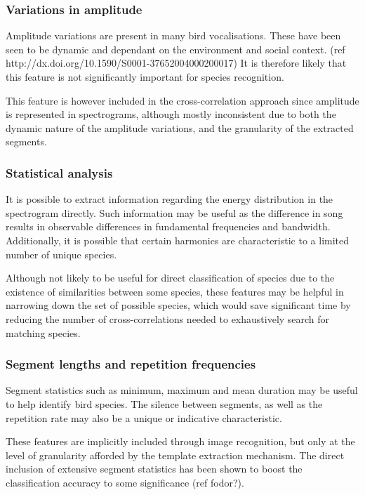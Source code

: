 \subsubsection{Variations in amplitude}
Amplitude variations are present in many bird vocalisations.
These have been seen to be dynamic and dependant on the environment and social
context. (ref http://dx.doi.org/10.1590/S0001-37652004000200017)
It is therefore likely that this feature is not significantly important for
species recognition.

This feature is however included in the cross-correlation approach since
amplitude is represented in spectrograms, although mostly inconsistent due to
both the dynamic nature of the amplitude variations, and the granularity of the
extracted segments.

\subsubsection{Statistical analysis}
It is possible to extract information regarding the energy distribution in the
spectrogram directly.
Such information may be useful as the difference in song results in observable
differences in fundamental frequencies and bandwidth.
Additionally, it is possible that certain harmonics are characteristic to a
limited number of unique species.

Although not likely to be useful for direct classification of species due to the
existence of similarities between some species, these features may be helpful in
narrowing down the set of possible species, which would save significant time by
reducing the number of cross-correlations needed to exhaustively search for
matching species.

\subsubsection{Segment lengths and repetition frequencies}
Segment statistics such as minimum, maximum and mean duration may be useful to
help identify bird species.
The silence between segments, as well as the repetition rate may also be a
unique or indicative characteristic.

These features are implicitly included through image recognition, but only at
the level of granularity afforded by the template extraction mechanism.
The direct inclusion of extensive segment statistics has been shown to boost
the classification accuracy to some significance (ref fodor?).
